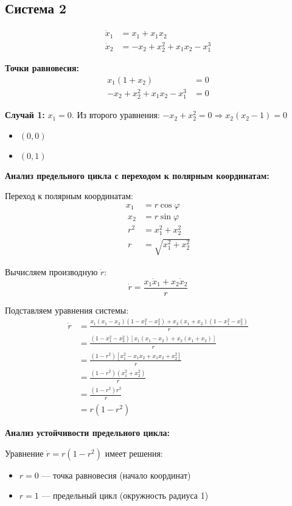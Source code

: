 \subsection*{Система 2}

\begin{align}
\dot{x}_1 &= x_1 + x_1 x_2 \\
\dot{x}_2 &= -x_2 + x_2^2 + x_1 x_2 - x_1^3
\end{align}

\textbf{Точки равновесия:}
\begin{align}
x_1(1 + x_2) &= 0 \\
-x_2 + x_2^2 + x_1 x_2 - x_1^3 &= 0
\end{align}

\textbf{Случай 1:} $x_1 = 0$. Из второго уравнения: $-x_2 + x_2^2 = 0 \Rightarrow x_2(x_2 - 1) = 0$
\begin{itemize}
\item $(0, 0)$
\item $(0, 1)$
\end{itemize}

\textbf{Анализ предельного цикла с переходом к полярным координатам:}

Переход к полярным координатам:
\begin{align}
x_1 &= r\cos\varphi \\\
x_2 &= r\sin\varphi \\\
r^2 &= x_1^2 + x_2^2 \\\
r &= \sqrt{x_1^2 + x_2^2}
\end{align}

Вычисляем производную $\dot{r}$:
$$\dot{r} = \frac{x_1\dot{x}_1 + x_2\dot{x}_2}{r}$$

Подставляем уравнения системы:
\begin{align}
\dot{r} &= \frac{x_1(x_1 - x_2)(1 - x_1^2 - x_2^2) + x_2(x_1 + x_2)(1 - x_1^2 - x_2^2)}{r} \\\
&= \frac{(1 - x_1^2 - x_2^2)[x_1(x_1 - x_2) + x_2(x_1 + x_2)]}{r} \\\
&= \frac{(1 - r^2)[x_1^2 - x_1x_2 + x_1x_2 + x_2^2]}{r} \\\
&= \frac{(1 - r^2)(x_1^2 + x_2^2)}{r} \\\
&= \frac{(1 - r^2)r^2}{r} \\\
&= r(1 - r^2)
\end{align}

\textbf{Анализ устойчивости предельного цикла:}

Уравнение $\dot{r} = r(1 - r^2)$ имеет решения:
\begin{itemize}
\item $r = 0$ --- точка равновесия (начало координат)
\item $r = 1$ --- предельный цикл (окружность радиуса 1)
\end{itemize}


